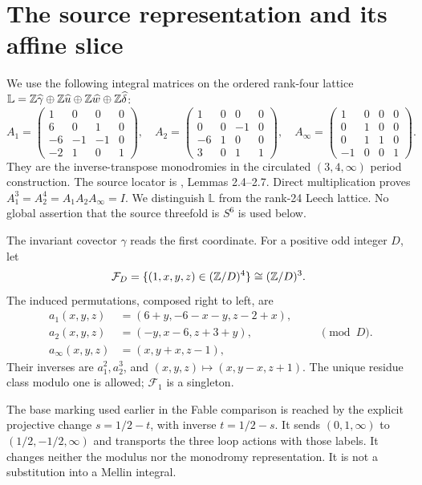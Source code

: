 \section{The source representation and its affine slice}
We use the following integral matrices on the ordered rank-four lattice
$\mathbb L=\mathbb Z\widehat\gamma\oplus\mathbb Z\widehat u\oplus\mathbb Z\widehat w\oplus\mathbb Z\widehat\delta$:
\begin{equation}\label{eq:A}
 A_1=\begin{pmatrix}1&0&0&0\\6&0&1&0\\-6&-1&-1&0\\-2&1&0&1\end{pmatrix},\quad
 A_2=\begin{pmatrix}1&0&0&0\\0&0&-1&0\\-6&1&0&0\\3&0&1&1\end{pmatrix},\quad
 A_\infty=\begin{pmatrix}1&0&0&0\\0&1&0&0\\0&1&1&0\\-1&0&0&1\end{pmatrix}.
\end{equation}
They are the inverse-transpose monodromies in the circulated $(3,4,\infty)$
period construction. The source locator is \cite[\S2]{source}, Lemmas 2.4--2.7.
Direct multiplication proves
$A_1^3=A_2^4=A_1A_2A_\infty=I$.
We distinguish $\mathbb L$ from the rank-24 Leech lattice.
No global assertion that the source threefold is $S^6$ is used below.

The invariant covector $\gamma$ reads the first coordinate.
For a positive odd integer $D$, let
\[
 \mathcal F_D=\{(1,x,y,z)\in(\mathbb Z/D)^4\}\cong(\mathbb Z/D)^3.
\]
The induced permutations, composed right to left, are
\begin{equation}\label{eq:affine}
\begin{aligned}
 a_1(x,y,z)&=(6+y,-6-x-y,z-2+x),\\
 a_2(x,y,z)&=(-y,x-6,z+3+y),\\
 a_\infty(x,y,z)&=(x,y+x,z-1),
\end{aligned}\qquad\pmod D.
\end{equation}
Their inverses are $a_1^2,a_2^3$, and $(x,y,z)\mapsto(x,y-x,z+1)$.
The unique residue class modulo one is allowed; $\mathcal F_1$ is a singleton.

The base marking used earlier in the Fable comparison is reached by the
explicit projective change $s=1/2-t$, with inverse $t=1/2-s$.
It sends $(0,1,\infty)$ to $(1/2,-1/2,\infty)$ and transports the three
loop actions with those labels. It changes neither the modulus nor the
monodromy representation. It is not a substitution into a Mellin integral.

